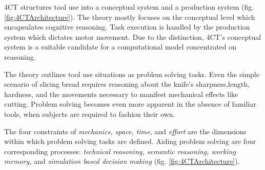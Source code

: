 \documentclass[11]{article}
\begin{document}
4CT structures tool use into a conceptual system and a production system (fig. \ref{fig:4CTArchitecture}).
The theory mostly focuses on the conceptual level which encapsulates cognitive reasoning.
Task execution is handled by the production system which dictates motor movement.   
Due to the distinction, 4CT's conceptual system is a suitable candidate for a computational model concentrated on reasoning.


The theory outlines tool use situations as problem solving tasks. 
Even the simple scenario of slicing bread requires reasoning about the knife's sharpness,length, hardness, and the movements necessary to manifest mechanical effects like cutting. 
Problem solving becomes even more apparent in the absence of familiar tools, when subjects are required to fashion their own. 

The four constraints of \emph{mechanics, space, time,} and \emph{effort} are the dimensions within which problem solving tasks are defined.
Aiding problem solving are four corresponding processes: \emph{technical reasoning, semantic reasoning, working memory,} and \emph{simulation based decision making} (fig. \ref{fig:4CTArchitecture}).  


\printbibliography
\end{document}
